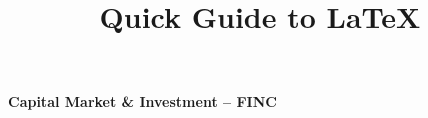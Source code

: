 \documentclass[10pt,landscape]{article}
\title{Quick Guide to LaTeX}
\begin{document}
\footnotesize





\newpage
	\begin{center}
	     \Large{\textbf{Capital Market \& Investment -- FINC}} \\
	\end{center}

	\begin{center}
	\end{center}
\end{document}
